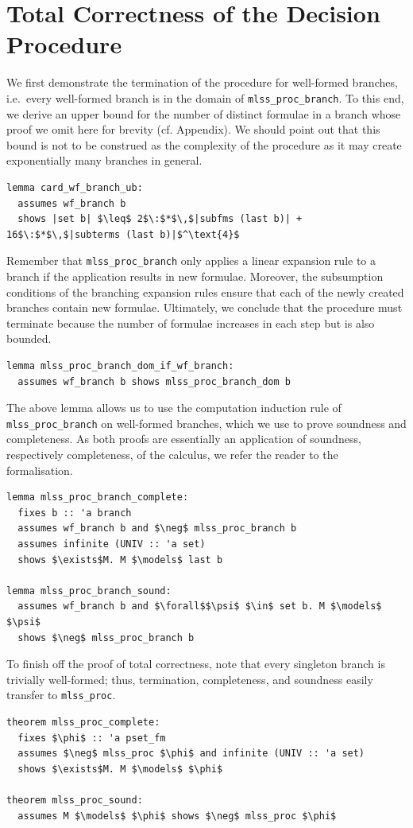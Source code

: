 \documentclass[runningheads]{llncs}
\begin{document}
\section{Total Correctness of the Decision Procedure\label{sec:correct}}
We first demonstrate the termination of the procedure for well-formed branches, i.e.\ every well-formed branch is in the domain of \lstinline!mlss_proc_branch!.
To this end, we derive an upper bound for the number of distinct formulae in a branch whose proof we omit here for brevity (cf. Appendix).
We should point out that this bound is not to be construed as the complexity of the procedure as it may create exponentially many branches in general.
\begin{lstlisting}[label={lst:card_branch}]
lemma card_wf_branch_ub:
  assumes wf_branch b
  shows |set b| $\leq$ 2$\:$*$\,$|subfms (last b)| + 16$\:$*$\,$|subterms (last b)|$^\text{4}$
\end{lstlisting}
Remember that \lstinline!mlss_proc_branch! only applies a linear expansion rule to a branch if the application results in new formulae.   
Moreover, the subsumption conditions of the branching expansion rules ensure that each of the newly created branches contain new formulae.
Ultimately, we conclude that the procedure must terminate because the number of formulae increases in each step but is also bounded. 
\begin{lstlisting}
lemma mlss_proc_branch_dom_if_wf_branch:
  assumes wf_branch b shows mlss_proc_branch_dom b
\end{lstlisting}

The above lemma allows us to use the computation induction rule of \lstinline!mlss_proc_branch! on well-formed branches, which we use to prove soundness and completeness.
As both proofs are essentially an application of soundness, respectively completeness, of the calculus, we refer the reader to the formalisation.
\begin{lstlisting}
lemma mlss_proc_branch_complete:
  fixes b :: 'a branch
  assumes wf_branch b and $\neg$ mlss_proc_branch b
  assumes infinite (UNIV :: 'a set)
  shows $\exists$M. M $\models$ last b

lemma mlss_proc_branch_sound:
  assumes wf_branch b and $\forall$$\psi$ $\in$ set b. M $\models$ $\psi$
  shows $\neg$ mlss_proc_branch b
\end{lstlisting}

To finish off the proof of total correctness, note that every singleton branch is trivially well-formed; thus, termination, completeness, and soundness easily transfer to \lstinline!mlss_proc!.
\begin{lstlisting}
theorem mlss_proc_complete:
  fixes $\phi$ :: 'a pset_fm
  assumes $\neg$ mlss_proc $\phi$ and infinite (UNIV :: 'a set)
  shows $\exists$M. M $\models$ $\phi$

theorem mlss_proc_sound:
  assumes M $\models$ $\phi$ shows $\neg$ mlss_proc $\phi$
\end{lstlisting}
\end{document}
